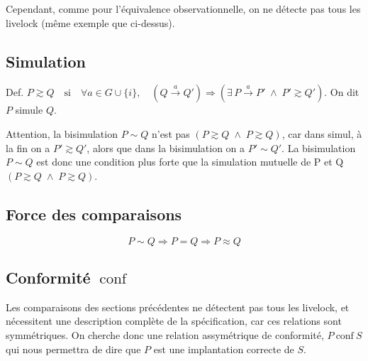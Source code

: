 \documentclass[a4paper,french,9pt]{article}
\def\GUi{G \cup \{i\}}
\def\transition#1{\stackrel{#1}{\longrightarrow}}
\def\forte{\sim}
\def\observationnelle{\approx}
\def\conf{\ \text{conf}\ }
\def\si{\quad\text{si}\quad}
\let\simule\gtrsim
\let\estsimulepar\gtrsim
\begin{document}
Cependant, comme pour l'équivalence observationnelle, on ne détecte pas tous les livelock (même exemple que ci-dessus).


\subsection{Simulation}

Def. $P \simule Q \si \forall a \in \GUi,\quad \left(Q\transition{a}Q'\right) \Rightarrow \left(\exists\, P\transition{a}P' \;\wedge\; P'
  \simule Q'\right)$. On dit \og $P$ simule $Q$\fg.

Attention, la bisimulation $P \forte Q$ n'est pas $\left(P \simule Q \;\wedge\; P \estsimulepar Q\right)$, car dans simul, à la fin on a $P'
\simule Q'$, alors que dans la bisimulation on a $P' \forte Q'$. La bisimulation $P \forte Q$ est donc une condition plus forte que la
simulation mutuelle de P et Q $\left(P \simule Q \;\wedge\; P \estsimulepar Q\right)$.

\subsection{Force des comparaisons}

$$ P \forte Q \Rightarrow P = Q \Rightarrow P \observationnelle Q $$

\clearpage
\subsection{Conformité $\conf$}

Les comparaisons des sections précédentes ne détectent pas tous les livelock, et nécessitent une description complète de la spécification,
car ces relations sont symmétriques. On cherche donc une relation assymétrique de conformité, $P\conf S$ qui nous permettra de dire que $P$
est une implantation correcte de $S$.
\end{document}
